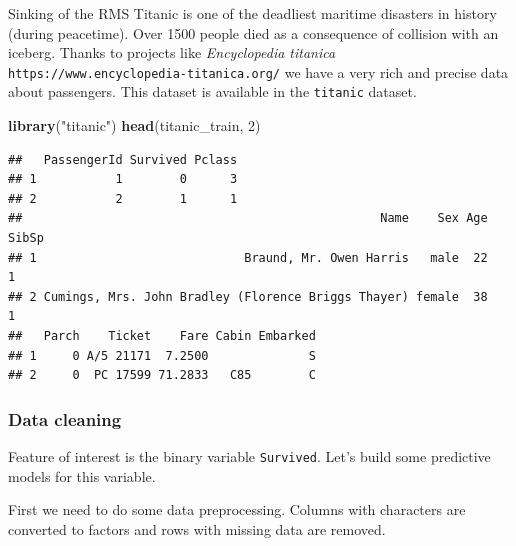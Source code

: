 \documentclass[]{krantz}
\newenvironment{Shaded}{\begin{snugshade}}{\end{snugshade}}
\newcommand{\DecValTok}[1]{\textcolor[rgb]{0.00,0.00,0.81}{#1}}
\newcommand{\KeywordTok}[1]{\textcolor[rgb]{0.13,0.29,0.53}{\textbf{#1}}}
\newcommand{\NormalTok}[1]{#1}
\newcommand{\OperatorTok}[1]{\textcolor[rgb]{0.81,0.36,0.00}{\textbf{#1}}}
\newcommand{\StringTok}[1]{\textcolor[rgb]{0.31,0.60,0.02}{#1}}
\theoremstyle{definition}
\theoremstyle{definition}
\theoremstyle{definition}
\theoremstyle{remark}
\begin{document}
Sinking of the RMS Titanic is one of the deadliest maritime disasters in
history (during peacetime). Over 1500 people died as a consequence of
collision with an iceberg. Thanks to projects like \emph{Encyclopedia
titanica} \texttt{https://www.encyclopedia-titanica.org/} we have a very
rich and precise data about passengers. This dataset is available in the
\texttt{titanic} dataset.

\begin{Shaded}
\begin{Highlighting}[]
\KeywordTok{library}\NormalTok{(}\StringTok{"titanic"}\NormalTok{)}
\KeywordTok{head}\NormalTok{(titanic_train, }\DecValTok{2}\NormalTok{)}
\end{Highlighting}
\end{Shaded}

\begin{verbatim}
##   PassengerId Survived Pclass
## 1           1        0      3
## 2           2        1      1
##                                                  Name    Sex Age SibSp
## 1                             Braund, Mr. Owen Harris   male  22     1
## 2 Cumings, Mrs. John Bradley (Florence Briggs Thayer) female  38     1
##   Parch    Ticket    Fare Cabin Embarked
## 1     0 A/5 21171  7.2500              S
## 2     0  PC 17599 71.2833   C85        C
\end{verbatim}

\hypertarget{data-cleaning}{%
\subsubsection{Data cleaning}\label{data-cleaning}}

Feature of interest is the binary variable \texttt{Survived}. Let's
build some predictive models for this variable.

First we need to do some data preprocessing. Columns with characters are
converted to factors and rows with missing data are removed.

\begin{Shaded}
\end{Shaded}
\end{document}
